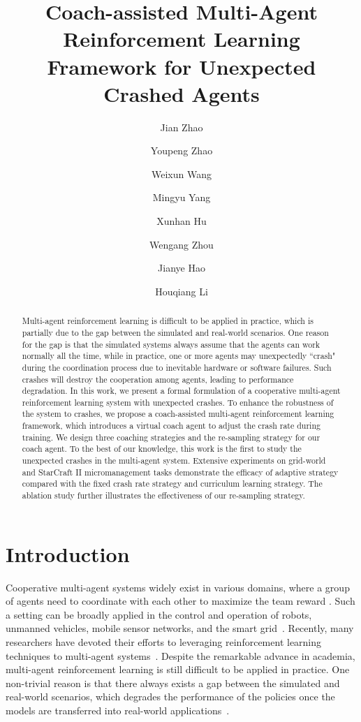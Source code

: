 \documentclass{article}
\title{Coach-assisted Multi-Agent Reinforcement Learning Framework for Unexpected Crashed Agents}
\author[1]{Jian Zhao}%
\author[1]{Youpeng Zhao}%
\author[2]{Weixun Wang}%
\author[1]{Mingyu Yang}%
\author[1]{Xunhan Hu}%
\author[1]{Wengang Zhou}%
\author[2]{Jianye Hao}%
\author[1]{Houqiang Li}%
\affil[1]{University of Science and Technology of China}
\affil[2]{College of Intelligence and Computing, Tianjin University}
\begin{document}
\maketitle
\begin{abstract}
Multi-agent reinforcement learning is difficult to be applied in practice, which is partially due to the gap between the simulated and real-world scenarios.
One reason for the gap is that the simulated systems always assume that the agents can work normally all the time, while in practice, one or more agents may unexpectedly ``crash" during the coordination process due to inevitable hardware or software failures.
Such crashes will destroy the cooperation among agents, leading to performance degradation.
In this work, we present a formal formulation of a cooperative multi-agent reinforcement learning system with unexpected crashes.
To enhance the robustness of the system to crashes, we propose a coach-assisted multi-agent reinforcement learning framework, which introduces a virtual coach agent to adjust the crash rate during training.
We design three coaching strategies and the re-sampling strategy for our coach agent.
To the best of our knowledge, this work is the first to study the unexpected crashes in the multi-agent system.
Extensive experiments on grid-world and StarCraft II micromanagement tasks demonstrate the efficacy of adaptive strategy compared with the fixed crash rate strategy and curriculum learning strategy.
The ablation study further illustrates the effectiveness of our re-sampling strategy.
\end{abstract}




\section{Introduction}
\label{chap:intro}
Cooperative multi-agent systems widely exist in various domains, where a group of agents need to coordinate with each other to maximize the team reward \cite{busoniu2008comprehensive,tuyls2012multiagent}. Such a setting can be broadly applied in the control and operation of robots, unmanned vehicles, mobile sensor networks, and the smart grid~\cite{zhang2021decentralized}.
Recently, many researchers have devoted their efforts to leveraging reinforcement learning techniques to multi-agent systems~\cite{sunehag2017value,rashid2018qmix,wang2020qplex, wang2020cooperative}.
Despite the remarkable advance in academia, multi-agent reinforcement learning is still difficult to be applied in practice.
One non-trivial reason is that there always exists a gap between the simulated and real-world scenarios, which degrades the performance of the policies once the models are transferred into real-world applications~\cite{zhao2020sim}.
\end{document}

